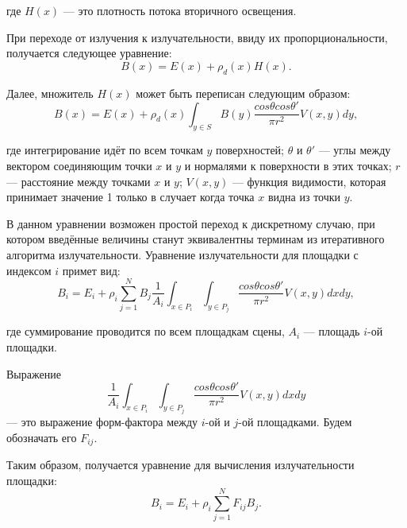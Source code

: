 \documentclass[12pt,fleqn]{article}
\begin{document}
где $H(x)$ --- это плотность потока вторичного освещения.

При переходе от излучения к излучательности, ввиду их пропорциональности, получается следующее уравнение:
\begin{equation*}
B(x) = E(x) + \rho_d(x) H(x).
\end{equation*}

Далее, множитель $H(x)$ может быть переписан следующим образом:
\begin{equation*}
B(x) = E(x) + \rho_d(x) \int_{y \in S}B(y) \frac{cos\theta cos \theta'}{\pi r^2} V(x, y) dy,
\end{equation*}

где интегрирование идёт по всем точкам $y$ поверхностей; $\theta$ и $\theta'$ --- углы между вектором соединяющим точки $x$ и $y$ и нормалями к поверхности в этих точках; $r$ --- расстояние между точками $x$ и $y$; $V(x, y)$ --- функция видимости, которая принимает значение 1 только в случает когда точка $x$ видна из точки $y$.

В данном уравнении возможен простой переход к дискретному случаю, при котором введённые величины станут эквивалентны терминам из итеративного алгоритма излучательности. Уравнение излучательности для площадки с индексом $i$ примет вид:
\begin{equation*}
B_i = E_i + \rho_i \sum\limits_{j = 1}^N B_j \frac{1}{A_i} \int_{x \in P_i} \int_{y \in P_j} \frac{cos\theta cos \theta'}{\pi r^2} V(x, y) dxdy,
\end{equation*}

где суммирование проводится по всем площадкам сцены, $A_i$ --- площадь $i$-ой площадки. 

Выражение $$\frac{1}{A_i} \int_{x \in P_i} \int_{y \in P_j} \frac{cos\theta cos \theta'}{\pi r^2} V(x, y) dxdy$$ --- это выражение форм-фактора между $i$-ой и $j$-ой площадками. Будем обозначать его $F_{ij}$.

Таким образом, получается уравнение для вычисления излучательности площадки:
\begin{equation*}
B_i = E_i + \rho_i \sum\limits_{j = 1}^N F_{ij} B_j.
\end{equation*}
\end{document}
